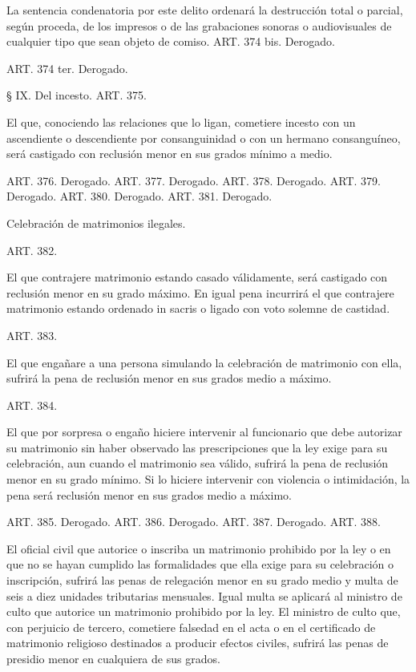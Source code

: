     La sentencia condenatoria por este delito ordenará la destrucción total o parcial, según proceda, de los impresos o de las grabaciones sonoras o audiovisuales de cualquier tipo que sean objeto de comiso.
    ART. 374 bis. Derogado.


    ART. 374 ter. Derogado.


    § IX. Del incesto.
    ART. 375.

    El que, conociendo las relaciones que lo ligan, cometiere incesto con un ascendiente o descendiente por consanguinidad o con un hermano consanguíneo, será castigado con reclusión menor en sus grados mínimo a medio.

    ART. 376. Derogado.
    ART. 377. Derogado.
    ART. 378. Derogado.
    ART. 379. Derogado.
    ART. 380. Derogado.
    ART. 381. Derogado.



    Celebración de matrimonios ilegales.





    ART. 382.

    El que contrajere matrimonio estando casado válidamente, será castigado con reclusión menor en su grado máximo.
    En igual pena incurrirá el que contrajere matrimonio estando ordenado in sacris o ligado con voto solemne de castidad.

    ART. 383.

    El que engañare a una persona simulando la celebración de matrimonio con ella, sufrirá la pena de reclusión menor en sus grados medio a máximo.



    ART. 384.

    El que por sorpresa o engaño hiciere intervenir al funcionario que debe autorizar su matrimonio sin haber observado las prescripciones que la ley exige para su celebración, aun cuando el matrimonio sea válido, sufrirá la pena de reclusión menor en su grado mínimo.
    Si lo hiciere intervenir con violencia o intimidación, la pena será reclusión menor en sus grados medio a máximo.

    ART. 385. Derogado.
    ART. 386. Derogado.
    ART. 387. Derogado.
    ART. 388.

    El oficial civil que autorice o inscriba un matrimonio prohibido por la ley o en que no se hayan cumplido las formalidades que ella exige para su celebración o inscripción, sufrirá las penas de relegación menor en su grado medio y multa de seis a diez unidades tributarias mensuales. Igual multa se aplicará al ministro de culto que autorice un matrimonio prohibido por la ley.
    El ministro de culto que, con perjuicio de tercero, cometiere falsedad en el acta o en el certificado de matrimonio religioso destinados a producir efectos civiles, sufrirá las penas de presidio menor en cualquiera de sus grados.


